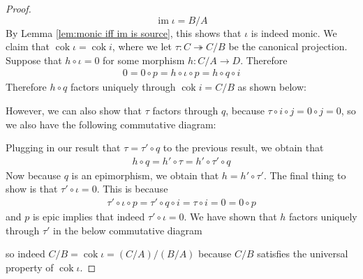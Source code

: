 \documentclass{article}
\DeclareMathOperator{\im}{\mathrm{im}}
\DeclareMathOperator{\cok}{\mathrm{cok}}
\begin{document}
\begin{proof}
    \[
    \im \iota=B/A
    \]
    By Lemma \ref{lem:monic iff im is source}, this shows that $\iota$ is indeed monic.
    We claim that $\cok \iota =\cok i$, where we let $\tau:C\twoheadrightarrow C/B$ be the canonical projection. Suppose that $h\circ \iota=0$ for some morphism $h:C/A\to D$. Therefore
    \begin{align*}
        0=0\circ p=h\circ \iota \circ p=h\circ q \circ i
    \end{align*}
Therefore $h\circ q$ factors uniquely through $\cok i=C/B$ as shown below:
\begin{center}
\end{center}
However, we can also show that $\tau$ factors through $q$, because $\tau \circ i \circ j=0\circ j=0$, so we also have the following commutative diagram:
\begin{center}
\end{center}
    Plugging in our result that $\tau=\tau'\circ q$ to the previous result, we obtain that
    \begin{align*}
        h\circ q=h'\circ \tau=h'\circ \tau' \circ q
    \end{align*}
    Now because $q$ is an epimorphism, we obtain that $h=h'\circ \tau'$. The final thing to show is that $\tau'\circ \iota=0$. This is because
    \begin{align*}
        \tau'\circ \iota\circ p=\tau'\circ q \circ i=\tau \circ i=0=0\circ p
    \end{align*}
    and $p$ is epic implies that indeed $\tau'\circ \iota=0$. We have shown that $h$ factors uniquely through $\tau'$ in the below commutative diagram
    \begin{center}
    \end{center}
    so indeed $C/B=\cok \iota=(C/A)/(B/A)$ because $C/B$ satisfies the universal property of $\cok \iota$.
\end{proof}
\end{document}
